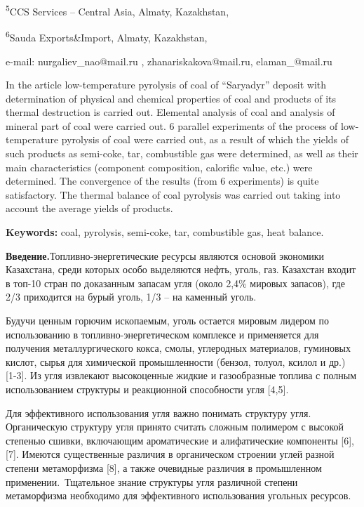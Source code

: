 \textsuperscript{5}CCS Services -- Central Asia, Almaty, Kazakhstan,

\textsuperscript{6}Sauda Exports\&Import, Almaty, Kazakhstan,

e-mail: nurgaliev\_nao@mail.ru , zhanariskakova@mail.ru,
elaman\_@mail.ru

In the article low-temperature pyrolysis of coal of ``Saryadyr'' deposit
with determination of physical and chemical properties of coal and
products of its thermal destruction is carried out. Elemental analysis
of coal and analysis of mineral part of coal were carried out. 6
parallel experiments of the process of low-temperature pyrolysis of coal
were carried out, as a result of which the yields of such products as
semi-coke, tar, combustible gas were determined, as well as their main
characteristics (component composition, calorific value, etc.) were
determined. The convergence of the results (from 6 experiments) is quite
satisfactory. The thermal balance of coal pyrolysis was carried out
taking into account the average yields of products.

{\bfseries Keywords:} coal, pyrolysis, semi-coke, tar, combustible gas,
heat balance.

{\bfseries Введение.}Топливно-энергетические ресурсы являются основой
экономики Казахстана, среди которых особо выделяются нефть, уголь, газ.
Казахстан входит в топ-10 стран по доказанным запасам угля (около 2,4\%
мировых запасов), где 2/3 приходится на бурый уголь, 1/3 -- на каменный
уголь.

Будучи ценным горючим ископаемым, уголь остается мировым лидером по
использованию в топливно-энергетическом комплексе и применяется для
получения металлургического кокса, смолы, углеродных материалов,
гуминовых кислот, сырья для химической промышленности (бензол, толуол,
ксилол и др.) {[}1-3{]}. Из угля извлекают высокоценные жидкие и
газообразные топлива с полным использованием структуры и реакционной
способности угля {[}4,5{]}.~

Для эффективного использования угля важно понимать структуру угля.
Органическую структуру угля принято считать сложным полимером с высокой
степенью сшивки, включающим ароматические и алифатические компоненты
{[}6{]}, {[}7{]}. Имеются существенные различия в органическом строении
углей разной степени метаморфизма {[}8{]}, а также очевидные различия в
промышленном применении.~Тщательное знание структуры угля различной
степени метаморфизма необходимо для эффективного использования угольных
ресурсов.

